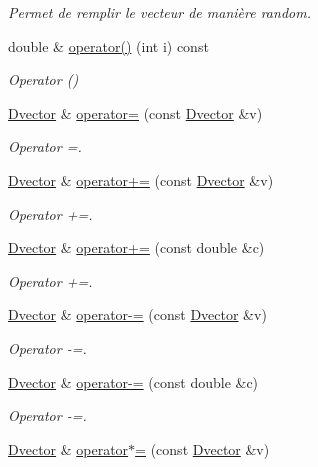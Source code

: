 \begin{DoxyCompactItemize}
\begin{DoxyCompactList}\small\item\em Permet de remplir le vecteur de manière random. \end{DoxyCompactList}\item 
double \& \hyperlink{classDvector_a64778b07b2a7b3de33b3df47df658da9}{operator()} (int i) const 
\begin{DoxyCompactList}\small\item\em Operator () \end{DoxyCompactList}\item 
\hyperlink{classDvector}{Dvector} \& \hyperlink{classDvector_a7d450c46faf4b75de106393ae5e63822}{operator=} (const \hyperlink{classDvector}{Dvector} \&v)
\begin{DoxyCompactList}\small\item\em Operator =. \end{DoxyCompactList}\item 
\hyperlink{classDvector}{Dvector} \& \hyperlink{classDvector_ab685d2a323d7d574e746fe4020e313f9}{operator+=} (const \hyperlink{classDvector}{Dvector} \&v)
\begin{DoxyCompactList}\small\item\em Operator +=. \end{DoxyCompactList}\item 
\hyperlink{classDvector}{Dvector} \& \hyperlink{classDvector_ae6715a7bddbb865336d2ff13777721fd}{operator+=} (const double \&c)
\begin{DoxyCompactList}\small\item\em Operator +=. \end{DoxyCompactList}\item 
\hyperlink{classDvector}{Dvector} \& \hyperlink{classDvector_a65bae8452b5a6646f9502f72264aa481}{operator-\/=} (const \hyperlink{classDvector}{Dvector} \&v)
\begin{DoxyCompactList}\small\item\em Operator -\/=. \end{DoxyCompactList}\item 
\hyperlink{classDvector}{Dvector} \& \hyperlink{classDvector_aeb48276f329b6a856e64994acf0c854b}{operator-\/=} (const double \&c)
\begin{DoxyCompactList}\small\item\em Operator -\/=. \end{DoxyCompactList}\item 
\hyperlink{classDvector}{Dvector} \& \hyperlink{classDvector_a0f7f02faaa3c717594380a3dfc034ca8}{operator$\ast$=} (const \hyperlink{classDvector}{Dvector} \&v)

\end{DoxyCompactItemize}
